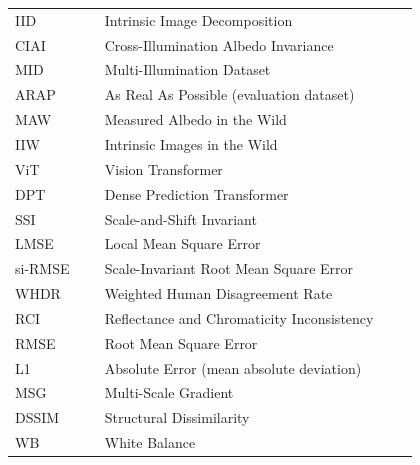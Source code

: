 \begin{longtable}{p{0.2\linewidth} p{0.7\linewidth}}

IID   & Intrinsic Image Decomposition \\
CIAI  & Cross-Illumination Albedo Invariance \\
MID   & Multi-Illumination Dataset \\
ARAP  & As Real As Possible (evaluation dataset) \\
MAW   & Measured Albedo in the Wild \\
IIW   & Intrinsic Images in the Wild \\
ViT   & Vision Transformer \\
DPT   & Dense Prediction Transformer \\
SSI   & Scale-and-Shift Invariant \\
LMSE  & Local Mean Square Error \\
si-RMSE & Scale-Invariant Root Mean Square Error \\
WHDR  & Weighted Human Disagreement Rate \\
RCI   & Reflectance and Chromaticity Inconsistency \\
RMSE  & Root Mean Square Error \\
L1    & Absolute Error (mean absolute deviation) \\
MSG   & Multi-Scale Gradient \\
DSSIM & Structural Dissimilarity \\
WB    & White Balance \\

\end{longtable}
